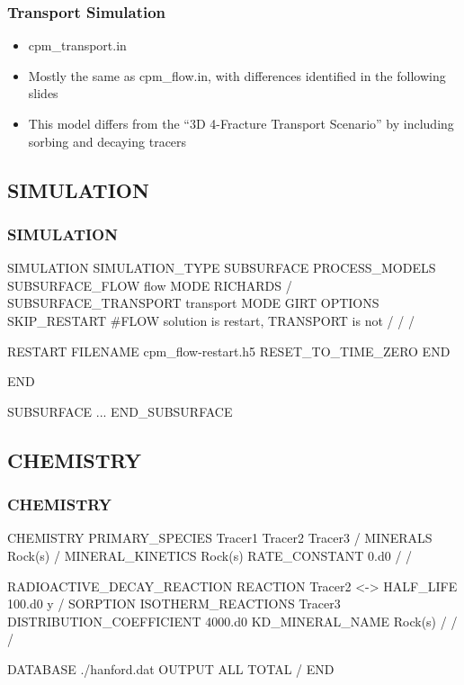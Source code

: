 \documentclass{beamer}
\newcommand\bluecomment[1]{{{\color{blue} #1}}}
\newcommand\magentacomment[1]{{{\color{magenta} #1}}}
\begin{document}
\begin{frame} [fragile,]\frametitle{Transport Simulation}
	\begin{itemize}
		\item cpm\_transport.in
		\item Mostly the same as cpm\_flow.in, with differences identified in the following slides
		\item This model differs from the ``3D 4-Fracture Transport  Scenario'' by including sorbing and decaying tracers
	\end{itemize}

\end{frame}

\subsection{SIMULATION}

\begin{frame}\frametitle{SIMULATION}

	\begin{semiverbatim}
SIMULATION
  SIMULATION_TYPE SUBSURFACE
  PROCESS_MODELS
    SUBSURFACE_FLOW flow
    MODE RICHARDS
  /
  \magentacomment{SUBSURFACE_TRANSPORT transport
    MODE GIRT
    OPTIONS
      SKIP_RESTART \bluecomment{#FLOW solution is restart, 
      	TRANSPORT is not}
    /
  /}
/



  \magentacomment{RESTART
    FILENAME cpm_flow-restart.h5
    RESET_TO_TIME_ZERO
  END}

END

SUBSURFACE
...
END_SUBSURFACE
	\end{semiverbatim}
\end{frame}


\subsection{CHEMISTRY}
\begin{frame}\frametitle{CHEMISTRY}
	
	\begin{semiverbatim}
CHEMISTRY
  PRIMARY_SPECIES
    Tracer1
    Tracer2
    Tracer3
  /
  MINERALS
    Rock(s)
  /
  MINERAL_KINETICS
    Rock(s)
      RATE_CONSTANT 0.d0
    /
  /
  
  
  RADIOACTIVE_DECAY_REACTION
    REACTION Tracer2 <->
    HALF_LIFE 100.d0 y
  /
  SORPTION
    ISOTHERM_REACTIONS
      Tracer3
        DISTRIBUTION_COEFFICIENT 4000.d0
        KD_MINERAL_NAME Rock(s)
      /
    /
  /
  
  
  
  
  
  DATABASE ./hanford.dat
  OUTPUT
    ALL
    TOTAL
  /
END
	\end{semiverbatim}
\end{frame}
\end{document}
